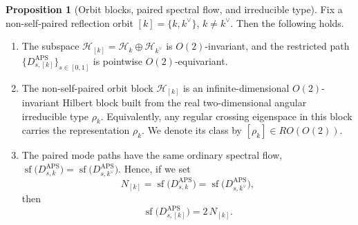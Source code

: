 \documentclass[11pt]{article}
\theoremstyle{definition}
\newtheorem{proposition}[theorem]{Proposition}
\DeclareMathOperator{\APS}{APS}
\numberwithin{equation}{section}
\begin{document}
\begin{proposition}[Orbit blocks, paired spectral flow, and irreducible type]
\label{prop:orbit_block_irreducible_section6}
Fix a non-self-paired reflection orbit \([k]=\{k,k^\vee\}\), \(k\neq k^\vee\).
Then the following holds.

\begin{enumerate}[label=\textup{(\roman*)}]
\item The subspace \(\mathcal H_{[k]}=\mathcal H_k\oplus\mathcal H_{k^\vee}\) is
\(O(2)\)-invariant, and the restricted path \(\{D_{s,[k]}^{\APS}\}_{s\in[0,1]}\) is pointwise \(O(2)\)-equivariant.

\item The non-self-paired orbit block $\mathcal H_{[k]}$ is an infinite-dimensional
$O(2)$-invariant Hilbert block built from the real two-dimensional angular
irreducible type $\rho_k$. Equivalently, any regular crossing eigenspace in
this block carries the representation $\rho_k$. We denote its class by \([\rho_{k}]\in RO(O(2))\).


\item The paired mode paths have the same ordinary spectral flow, \(\operatorname{sf}\!\bigl(D_{s,k}^{\APS}\bigr)
=
\operatorname{sf}\!\bigl(D_{s,k^\vee}^{\APS}\bigr)\).
Hence, if we set
\begin{equation}\label{eq:N_orbit_redefined_section6}
N_{[k]}
=
\operatorname{sf}\!\bigl(D_{s,k}^{\APS}\bigr)
=
\operatorname{sf}\!\bigl(D_{s,k^\vee}^{\APS}\bigr),
\end{equation}
then
\begin{equation}\label{eq:orbit_block_sf_twice_section6}
\operatorname{sf}\!\bigl(D_{s,[k]}^{\APS}\bigr)
=
2\,N_{[k]}.
\end{equation}
\end{enumerate}
\end{proposition}
\end{document}
